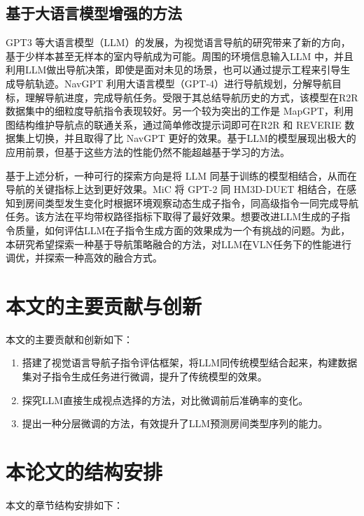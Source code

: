 \documentclass[bachelor]{thesis-uestc}
\begin{document}
\subsection{基于大语言模型增强的方法}

GPT3\cite{ouyangTrainingLanguageModels2022} 等大语言模型（LLM）的发展，为视觉语言导航的研究带来了新的方向，基于少样本甚至无样本的室内导航成为可能。周围的环境信息输入LLM 中，并且利用LLM做出导航决策，即使是面对未见的场景，也可以通过提示工程来引导生成导航轨迹。NavGPT\cite{zhouNavGPTExplicitReasoning2023a} 利用大语言模型（GPT-4\cite{openaiGPT4TechnicalReport2024}）进行导航规划，分解导航目标，理解导航进度，完成导航任务。受限于其总结导航历史的方式，该模型在R2R数据集中的细粒度导航指令表现较好。另一个较为突出的工作是 MapGPT\cite{chenMapGPTMapGuidedPrompting2024}，利用图结构维护导航点的联通关系，通过简单修改提示词即可在R2R 和 REVERIE 数据集上切换，并且取得了比 NavGPT 更好的效果。基于LLM的模型展现出极大的应用前景，但基于这些方法的性能仍然不能超越基于学习的方法。

  
基于上述分析，一种可行的探索方向是将 LLM 同基于训练的模型相结合，从而在导航的关键指标上达到更好效果。MiC\cite{qiaoMarchChatInteractive2023} 将 GPT-2\cite{brownLanguageModelsAre2020} 同 HM3D-DUET \cite{chenLearningUnlabeled3D2022} 相结合，在感知到房间类型发生变化时根据环境观察动态生成子指令，同高级指令一同完成导航任务。该方法在平均带权路径指标下取得了最好效果。想要改进LLM生成的子指令质量，如何评估LLM在子指令生成方面的效果成为一个有挑战的问题。为此，本研究希望探索一种基于导航策略融合的方法，对LLM在VLN任务下的性能进行调优，并探索一种高效的融合方式。
\section{本文的主要贡献与创新}

本文的主要贡献和创新如下：
\begin{enumerate}
    \item 搭建了视觉语言导航子指令评估框架，将LLM同传统模型结合起来，构建数据集对子指令生成任务进行微调，提升了传统模型的效果。
    \item 探究LLM直接生成视点选择的方法，对比微调前后准确率的变化。
    \item 提出一种分层微调的方法，有效提升了LLM预测房间类型序列的能力。
\end{enumerate}
\section{本论文的结构安排}

本文的章节结构安排如下：
\end{document}
